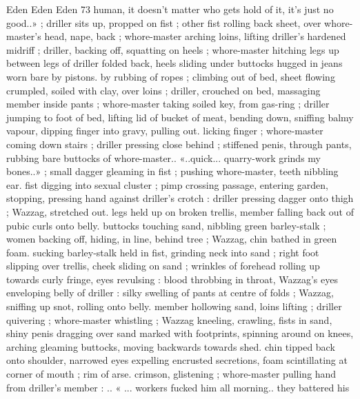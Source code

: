 Eden Eden Eden 73
human, it doesn’t matter who gets hold of it, it's just no good..» ;
driller sits up, propped on fist ; other fist rolling back sheet, over
whore-master’s head, nape, back ; whore-master arching loins, lifting
driller's hardened midriff ; driller, backing off, squatting on heels ;
whore-master hitching legs up between legs of driller folded back,
heels sliding under buttocks hugged in jeans worn bare by pistons.
by rubbing of ropes ; climbing out of bed, sheet flowing crumpled,
soiled with clay, over loins ; driller, crouched on bed, massaging
member inside pants ; whore-master taking soiled key, from gas-ring
; driller jumping to foot of bed, lifting lid of bucket of meat, bending
down, sniffing balmy vapour, dipping finger into gravy, pulling out.
licking finger ; whore-master coming down stairs ; driller pressing
close behind ; stiffened penis, through pants, rubbing bare buttocks
of whore-master.. «..quick... quarry-work grinds my bones..» ; small
dagger gleaming in fist ; pushing whore-master, teeth nibbling ear.
fist digging into sexual cluster ; pimp crossing passage, entering
garden, stopping, pressing hand against driller’s crotch : driller
pressing dagger onto thigh ; Wazzag, stretched out. legs held up on
broken trellis, member falling back out of pubic curls onto belly.
buttocks touching sand, nibbling green barley-stalk ; women backing
off, hiding, in line, behind tree ; Wazzag, chin bathed in green foam.
sucking barley-stalk held in fist, grinding neck into sand ; right foot
slipping over trellis, cheek sliding on sand ; wrinkles of forehead
rolling up towards curly fringe, eyes revulsing : blood throbbing in
throat, Wazzag's eyes enveloping belly of driller : silky swelling of
pants at centre of folds ; Wazzag, sniffing up snot, rolling onto belly.
member hollowing sand, loins lifting ; driller quivering ; whore-master
whistling ; Wazzag kneeling, crawling, fists in sand, shiny penis
dragging over sand marked with footprints, spinning around on
knees, arching gleaming buttocks, moving backwards towards shed.
chin tipped back onto shoulder, narrowed eyes expelling encrusted
secretions, foam scintillating at corner of mouth ; rim of arse.
crimson, glistening ; whore-master pulling hand from driller's
member : .. « ... workers fucked him all morning.. they battered his

